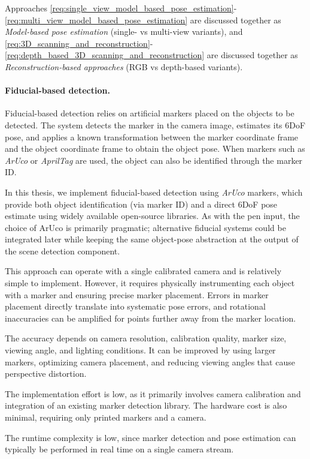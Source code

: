 Approaches \ref{req:single_view_model_based_pose_estimation}-\ref{req:multi_view_model_based_pose_estimation} are discussed together as \emph{Model-based pose estimation} (single- vs multi-view variants), and \ref{req:3D_scanning_and_reconstruction}-\ref{req:depth_based_3D_scanning_and_reconstruction} are discussed together as \emph{Reconstruction-based approaches} (RGB vs depth-based variants).

\paragraph{Fiducial-based detection.}
Fiducial-based detection relies on artificial markers placed on the objects to be detected. The system detects the marker in the camera image, estimates its 6DoF pose, and applies a known transformation between the marker coordinate frame and the object coordinate frame to obtain the object pose. When markers such as \emph{ArUco} or \emph{AprilTag} are used, the object can also be identified through the marker ID.

In this thesis, we implement fiducial-based detection using \emph{ArUco} markers, which provide both object identification (via marker ID) and a direct 6DoF pose estimate using widely available open-source libraries. As with the pen input, the choice of ArUco is primarily pragmatic; alternative fiducial systems could be integrated later while keeping the same object-pose abstraction at the output of the scene detection component.

This approach can operate with a single calibrated camera and is relatively simple to implement. However, it requires physically instrumenting each object with a marker and ensuring precise marker placement. Errors in marker placement directly translate into systematic pose errors, and rotational inaccuracies can be amplified for points further away from the marker location.

The accuracy depends on camera resolution, calibration quality, marker size, viewing angle, and lighting conditions. It can be improved by using larger markers, optimizing camera placement, and reducing viewing angles that cause perspective distortion.

The implementation effort is low, as it primarily involves camera calibration and integration of an existing marker detection library. The hardware cost is also minimal, requiring only printed markers and a camera.

The runtime complexity is low, since marker detection and pose estimation can typically be performed in real time on a single camera stream.

